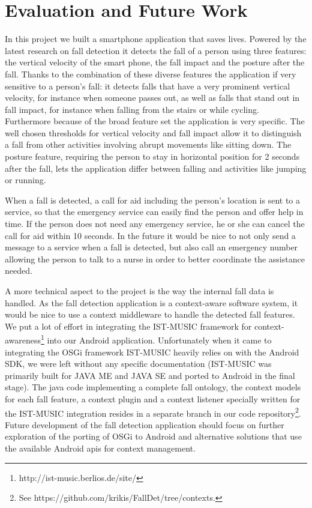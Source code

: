 \documentclass[a4paper, 10pt]{article}
\begin{document}
\newpage
\section{Evaluation and Future Work}
In this project we built a smartphone application that saves lives. Powered by the latest research on fall detection it detects the fall of a person using three features: the vertical velocity of the smart phone, the fall impact and the posture after the fall. Thanks to the combination of these diverse features the application if very sensitive to a person's fall: it detects falls that have a very prominent vertical velocity, for instance when someone passes out, as well as falls that stand out in fall impact, for instance when falling from the stairs or while cycling. Furthermore because of the broad feature set the application is very specific. The well chosen thresholds for vertical velocity and fall impact allow it to distinguish a fall from other activities involving abrupt movements like sitting down. The posture feature, requiring the person to stay in horizontal position for 2 seconds after the fall, lets the application differ between falling and activities like jumping or running. 

When a fall is detected, a call for aid including the person's location is sent to a service, so that  
the emergency service can easily find the person and offer help in time. If the person does not need any emergency service, he or she can cancel the call for aid within 10 seconds. In the future it would be nice to not only send a message to a service when a fall is detected, but also call an emergency number allowing the person to talk to a nurse in order to better coordinate the assistance needed.

A more technical aspect to the project is the way the internal fall data is handled. As the fall detection application is a context-aware software system, it would be nice to use a context middleware to handle the detected fall features. We put a lot of effort in integrating the IST-MUSIC framework for context-awareness\footnote{http://ist-music.berlios.de/site/} into our Android application. Unfortunately when it came to integrating the OSGi framework IST-MUSIC heavily relies on with the Android SDK, we were left without any specific documentation (IST-MUSIC was primarily built for JAVA ME and JAVA SE and ported to Android in the final stage). The java code implementing a complete fall ontology, the context models for each fall feature, a context plugin and a context listener specially written for the IST-MUSIC integration resides in a separate branch in our code repository\footnote{See https://github.com/krikis/FallDet/tree/contexts.}. Future development of the fall detection application should focus on further exploration of the porting of OSGi to Android and alternative solutions that use the available Android apis for context management.
\end{document}
